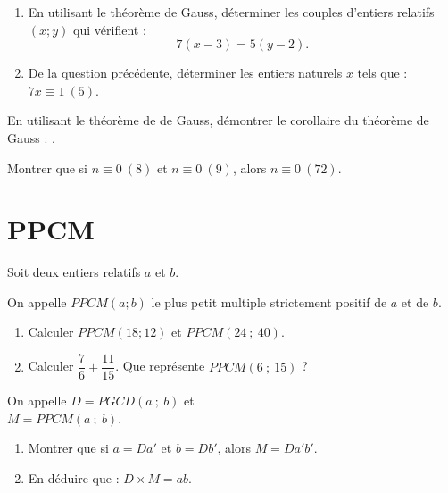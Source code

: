 \documentclass{cornouaille}
\begin{document}
\begin{exercice}
\begin{enumerate}
\item En utilisant le théorème de Gauss, déterminer les couples d'entiers relatifs $(x;y)$ qui vérifient :
$$7(x-3)=5(y-2).$$
\item De la question précédente, déterminer les entiers naturels $x$ tels que : $7x\equiv1~(5)$.
\end{enumerate}
\end{exercice}

\begin{exercice}
En utilisant le théorème de de Gauss, démontrer le corollaire du théorème de Gauss : \fg .
\end{exercice}

\begin{exercice}
  Montrer que si $n\equiv0~(8)$ et $n\equiv0~(9)$, alors
  $n\equiv0~(72)$.
\end{exercice}

\section{PPCM}
\begin{exercice}
  Soit deux entiers relatifs $a$ et $b$. 
  
  On appelle $PPCM(a; b)$ le plus petit multiple strictement positif
  de $a$ et de $b$.
\begin{enumerate}
\item Calculer $PPCM(18; 12)$ et $PPCM(24\ ;\ 40)$.
\item Calculer $\dfrac{7}{6}+\dfrac{11}{15}$. Que représente
  $PPCM(6\ ;\ 15)$ ?
\end{enumerate}
\end{exercice}

\begin{exercice}\label{ExoPPCM}
On appelle $D = PGCD(a\ ;\ b)$ et\\ $M = PPCM(a\ ;\ b)$.
\begin{enumerate}
\item Montrer que si $a = Da'$ et $b = Db'$, alors $M = Da'b'$.
\item En déduire que : $D\times M = ab$.
\end{enumerate}
\end{exercice}
\end{document}
